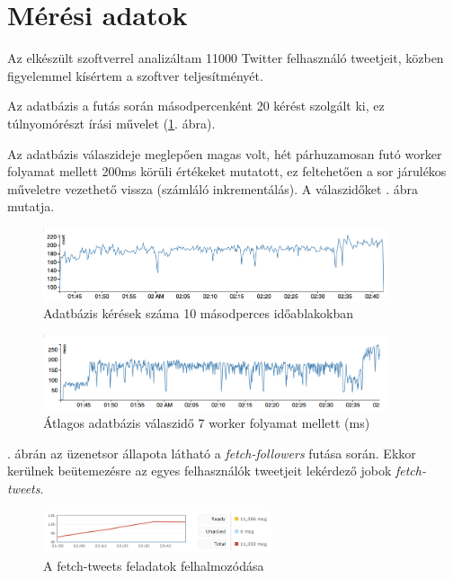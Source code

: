 \section{Mérési adatok}

Az elkészült szoftverrel analizáltam 11000 Twitter felhasználó tweetjeit,
közben figyelemmel kísértem a szoftver teljesítményét.

Az adatbázis a futás során másodpercenként 20 kérést szolgált ki,
ez túlnyomórészt írási művelet (\ref{fig:req-per-sec}. ábra).

Az adatbázis válaszideje meglepően magas volt, hét párhuzamosan futó worker
folyamat mellett 200ms körüli értékeket mutatott, ez feltehetően a sor
járulékos műveletre vezethető vissza (számláló inkrementálás).
A válaszidőket . ábra mutatja.

\begin{figure}[h!]
  \centering
  \includegraphics[width=0.9\textwidth]{figures/req-per-sec}
  \caption{Adatbázis kérések száma 10 másodperces időablakokban}
  \label{fig:req-per-sec}
\end{figure}

\begin{figure}[h!]
  \centering
  \includegraphics[width=0.9\textwidth]{figures/mean-db-time}
  \caption{Átlagos adatbázis válaszidő 7 worker folyamat mellett (ms)}
  \label{fig:mean-db-time}
\end{figure}

. ábrán az üzenetsor állapota látható a
\emph{fetch-followers} futása során. Ekkor kerülnek beütemezésre az egyes
felhasználók tweetjeit lekérdező jobok \emph{fetch-tweets}.

\begin{figure}[h!]
  \centering
  \includegraphics[width=0.6\textwidth]{figures/queue-progress}
  \caption{A fetch-tweets feladatok felhalmozódása}
  \label{fig:queue-progress}
\end{figure}

